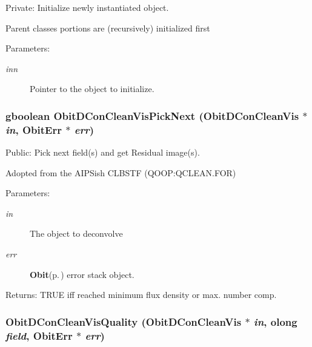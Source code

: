 Private: Initialize newly instantiated object. 

Parent classes portions are (recursively) initialized first \begin{Desc}
\item[Parameters:]
\begin{description}
\item[{\em inn}]Pointer to the object to initialize. \end{description}
\end{Desc}
\subsubsection{\setlength{\rightskip}{0pt plus 5cm}gboolean Obit\-DCon\-Clean\-Vis\-Pick\-Next ({\bf Obit\-DCon\-Clean\-Vis} $\ast$ {\em in}, {\bf Obit\-Err} $\ast$ {\em err})}\label{ObitDConCleanVis_8c_a22}


Public: Pick next field(s) and get Residual image(s). 

Adopted from the AIPSish CLBSTF (QOOP:QCLEAN.FOR) \begin{Desc}
\item[Parameters:]
\begin{description}
\item[{\em in}]The object to deconvolve \item[{\em err}]{\bf Obit}{\rm (p.\,\pageref{structObit})} error stack object. \end{description}
\end{Desc}
\begin{Desc}
\item[Returns:]TRUE iff reached minimum flux density or max. number comp. \end{Desc}
\subsubsection{ Obit\-DCon\-Clean\-Vis\-Quality ({\bf Obit\-DCon\-Clean\-Vis} $\ast$ {\em in}, {\bf olong} {\em field}, {\bf Obit\-Err} $\ast$ {\em err})}\label{ObitDConCleanVis_8c_a23}


